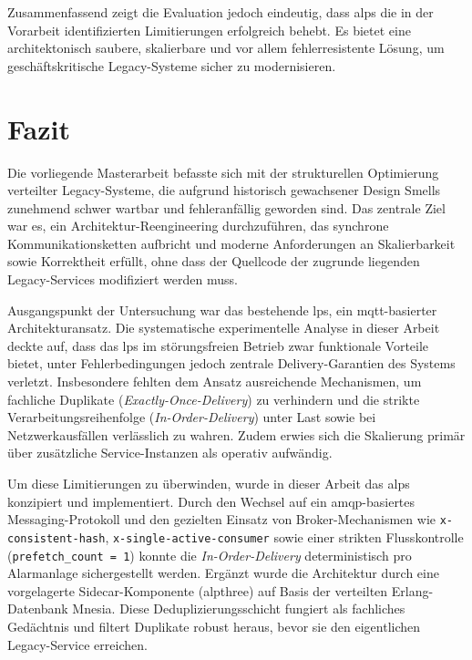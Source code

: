 Zusammenfassend zeigt die Evaluation jedoch eindeutig, dass \gls{alps} die in der Vorarbeit identifizierten Limitierungen erfolgreich behebt. Es bietet eine architektonisch saubere, skalierbare und vor allem fehlerresistente Lösung, um geschäftskritische Legacy-Systeme sicher zu modernisieren.

\chapter{Fazit}
\label{ch:fazit}

Die vorliegende Masterarbeit befasste sich mit der strukturellen Optimierung verteilter Legacy-Systeme, die aufgrund historisch gewachsener Design Smells zunehmend schwer wartbar und fehleranfällig geworden sind. Das zentrale Ziel war es, ein Architektur-Reengineering durchzuführen, das synchrone Kommunikationsketten aufbricht und moderne Anforderungen an Skalierbarkeit sowie Korrektheit erfüllt, ohne dass der Quellcode der zugrunde liegenden Legacy-Services modifiziert werden muss.

Ausgangspunkt der Untersuchung war das bestehende \gls{lps}, ein \gls{mqtt}-basierter Architekturansatz. Die systematische experimentelle Analyse in dieser Arbeit deckte auf, dass das \gls{lps} im störungsfreien Betrieb zwar funktionale Vorteile bietet, unter Fehlerbedingungen jedoch zentrale Delivery-Garantien des Systems verletzt. Insbesondere fehlten dem Ansatz ausreichende Mechanismen, um fachliche Duplikate (\textit{Exactly-Once-Delivery}) zu verhindern und die strikte Verarbeitungsreihenfolge (\textit{In-Order-Delivery}) unter Last sowie bei Netzwerkausfällen verlässlich zu wahren. Zudem erwies sich die Skalierung primär über zusätzliche Service-Instanzen als operativ aufwändig.

Um diese Limitierungen zu überwinden, wurde in dieser Arbeit das \gls{alps} konzipiert und implementiert. Durch den Wechsel auf ein \gls{amqp}-basiertes Messaging-Protokoll und den gezielten Einsatz von Broker-Mechanismen wie \texttt{x-consistent-hash}, \texttt{x-single-active-consumer} sowie einer strikten Flusskontrolle (\texttt{prefetch\_count = 1}) konnte die \textit{In-Order-Delivery} deterministisch pro Alarmanlage sichergestellt werden. Ergänzt wurde die Architektur durch eine vorgelagerte Sidecar-Komponente (\gls{alpthree}) auf Basis der verteilten Erlang-Datenbank Mnesia. Diese Deduplizierungsschicht fungiert als fachliches Gedächtnis und filtert Duplikate robust heraus, bevor sie den eigentlichen Legacy-Service erreichen.

